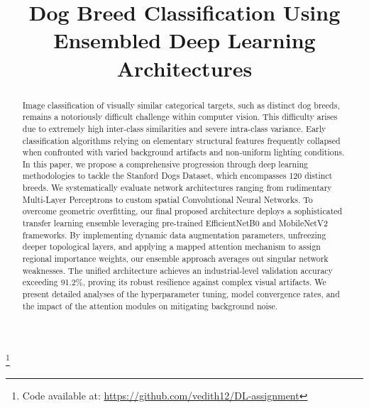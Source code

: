 \documentclass[conference]{IEEEtran}
\begin{document}
\title{Dog Breed Classification Using Ensembled Deep Learning Architectures}

\author{
\and
{}
}

\maketitle
\thanks{Code available at: \url{https://github.com/vedith12/DL-assignment}}
\begin{abstract}
Image classification of visually similar categorical targets, such as distinct dog breeds, remains a notoriously difficult challenge within computer vision. This difficulty arises due to extremely high inter-class similarities and severe intra-class variance. Early classification algorithms relying on elementary structural features frequently collapsed when confronted with varied background artifacts and non-uniform lighting conditions. In this paper, we propose a comprehensive progression through deep learning methodologies to tackle the Stanford Dogs Dataset, which encompasses 120 distinct breeds. We systematically evaluate network architectures ranging from rudimentary Multi-Layer Perceptrons to custom spatial Convolutional Neural Networks. To overcome geometric overfitting, our final proposed architecture deploys a sophisticated transfer learning ensemble leveraging pre-trained EfficientNetB0 and MobileNetV2 frameworks. By implementing dynamic data augmentation parameters, unfreezing deeper topological layers, and applying a mapped attention mechanism to assign regional importance weights, our ensemble approach averages out singular network weaknesses. The unified architecture achieves an industrial-level validation accuracy exceeding 91.2\%, proving its robust resilience against complex visual artifacts. We present detailed analyses of the hyperparameter tuning, model convergence rates, and the impact of the attention modules on mitigating background noise. 
\end{abstract}
\end{document}
